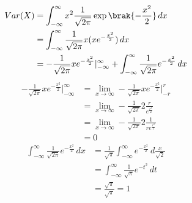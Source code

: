 \documentclass[journal,12pt,twocolumn]{IEEEtran}
\renewcommand\thesection{\arabic{section}}
\begin{document}
\begin{enumerate}[label=\thesection.\arabic*
,ref=\thesection.\theenumi]
\begin{align}
    Var(X) &=\int_{-\infty}^{\infty}x^2\frac{1}{\sqrt{2\pi}}\exp\brak{-\frac{x^2}{2}}\,dx\\
    &= \int_{-\infty}^{\infty}\frac{1}{\sqrt{2\pi}}x(xe^{-\frac{x^2}{2}})\,dx\\
    &= -\frac{1}{\sqrt{2\pi}}xe^{-\frac{x^2}{2}}|_{-\infty}^{\infty} + \int_{-\infty}^{\infty}\frac{1}{\sqrt{2\pi}}e^{-\frac{x^2}{2}}\,dx
\end{align}
\begin{align}
        -\frac{1}{\sqrt{2\pi}}xe^{-\frac{x^2}{2}}|_{-\infty}^{\infty} &= \lim_{x\to\infty}-\frac{1}{\sqrt{2\pi}}xe^{-\frac{x^2}{2}}|_{-r}^{r}\\
        &= \lim_{x\to\infty}-\frac{1}{\sqrt{2\pi}}2\frac{r}{e^{\frac{r^2}{2}}}\\
                &= \lim_{x\to\infty}-\frac{1}{\sqrt{2\pi}}2\frac{1}{re^{\frac{r^2}{2}}}\\
                &= 0
\end{align}
\begin{align}
    \int_{-\infty}^{\infty}\frac{1}{\sqrt{2\pi}}e^{-\frac{x^2}{2}}\,dx &= \frac{1}{\sqrt{\pi}}\int_{-\infty}^{\infty}e^{-\frac{x^2}{2}}\,d\frac{x}{\sqrt{2}}\\
    &= \int_{-\infty}^{\infty}\frac{1}{\sqrt{\pi}}e^{-t^2}\,dt\\
    &= \frac{\sqrt{\pi}}{\sqrt{\pi}} = 1
\end{align}
\end{enumerate}
\end{document}
